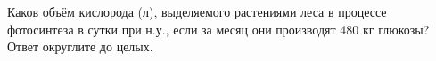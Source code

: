 
Каков
объём кислорода (л), выделяемого растениями леса в процессе фотосинтеза в сутки
при н.у., если за месяц они производят 480 кг глюкозы? Ответ округлите до
целых.

\explanationSection

